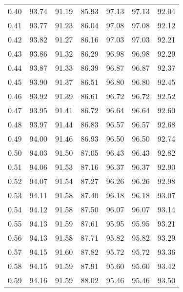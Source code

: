 \begin{tabular}{|c|c|c|c|c|c|c|}
      0.40 &     93.74 &     91.19 &      85.93 &   97.13 &      97.13 &         92.04 \\
      0.41 &     93.77 &     91.23 &      86.04 &   97.08 &      97.08 &         92.12 \\
      0.42 &     93.82 &     91.27 &      86.16 &   97.03 &      97.03 &         92.21 \\
      0.43 &     93.86 &     91.32 &      86.29 &   96.98 &      96.98 &         92.29 \\
      0.44 &     93.87 &     91.33 &      86.39 &   96.87 &      96.87 &         92.37 \\
      0.45 &     93.90 &     91.37 &      86.51 &   96.80 &      96.80 &         92.45 \\
      0.46 &     93.92 &     91.39 &      86.61 &   96.72 &      96.72 &         92.52 \\
      0.47 &     93.95 &     91.41 &      86.72 &   96.64 &      96.64 &         92.60 \\
      0.48 &     93.97 &     91.44 &      86.83 &   96.57 &      96.57 &         92.68 \\
      0.49 &     94.00 &     91.46 &      86.93 &   96.50 &      96.50 &         92.74 \\
      0.50 &     94.03 &     91.50 &      87.05 &   96.43 &      96.43 &         92.82 \\
      0.51 &     94.06 &     91.53 &      87.16 &   96.37 &      96.37 &         92.90 \\
      0.52 &     94.07 &     91.54 &      87.27 &   96.26 &      96.26 &         92.98 \\
      0.53 &     94.11 &     91.58 &      87.40 &   96.18 &      96.18 &         93.07 \\
      0.54 &     94.12 &     91.58 &      87.50 &   96.07 &      96.07 &         93.14 \\
      0.55 &     94.13 &     91.59 &      87.61 &   95.95 &      95.95 &         93.21 \\
      0.56 &     94.13 &     91.58 &      87.71 &   95.82 &      95.82 &         93.29 \\
      0.57 &     94.15 &     91.60 &      87.82 &   95.72 &      95.72 &         93.36 \\
      0.58 &     94.15 &     91.59 &      87.91 &   95.60 &      95.60 &         93.42 \\
      0.59 &     94.16 &     91.59 &      88.02 &   95.46 &      95.46 &         93.50 \\

\end{tabular}
